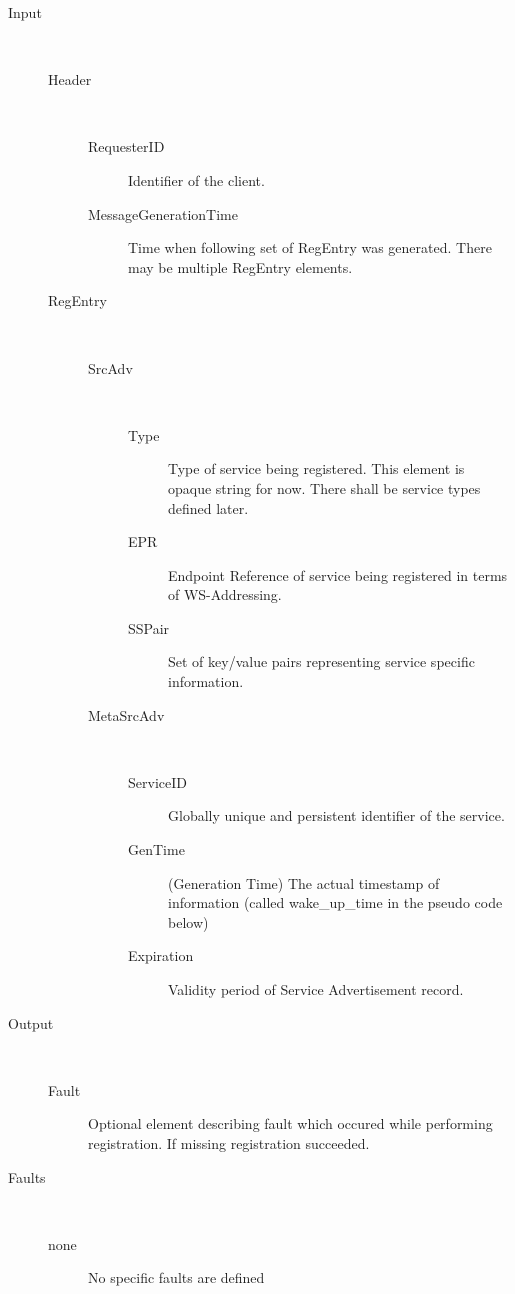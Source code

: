 \documentclass{book}
\begin{document}
\begin{description}

  \item[Input]~\begin{description}
    \item[Header]~\begin{description}
      \item[RequesterID] Identifier of the client.
      \item[MessageGenerationTime] Time when following set of RegEntry was generated. There may be multiple RegEntry elements.
    \end{description}
    \item[RegEntry]~\begin{description}
      \item[SrcAdv]~\begin{description}
        \item[Type] Type of service being registered. This element is opaque string for now. There shall be service types defined later.
        \item[EPR] Endpoint Reference of service being registered in terms of WS-Addressing.
        \item[SSPair] Set of key/value pairs representing service specific information.
      \end{description}
      \item[MetaSrcAdv]~\begin{description}
        \item[ServiceID] Globally unique and persistent identifier of the service.
        \item[GenTime] (Generation Time) The actual timestamp of information (called wake\_up\_time in the pseudo code below)
        \item[Expiration] Validity period of Service Advertisement record.
      \end{description}
    \end{description}
  \end{description}

  \item[Output]~\begin{description}
    \item[Fault] Optional element describing fault which occured while performing registration. If missing registration succeeded.
  \end{description}

  \item[Faults]~\begin{description}
    \item[none]No specific faults are defined
  \end{description}

\end{description}
\end{document}
